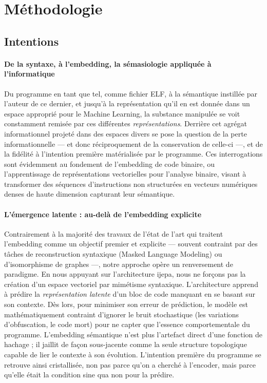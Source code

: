 \section{Méthodologie}\label{sec:methodologie}

\subsection{Intentions}\label{sub:intentions}

\paragraph{De la syntaxe, à l'embedding, la sémasiologie appliquée à l'informatique}

Du programme en tant que tel, comme fichier ELF, à la sémantique instillée par l'auteur de ce dernier, et jusqu'à la représentation qu'il en est donnée dans un espace approprié pour le Machine Learning, la substance manipulée se voit constamment remisée par ces différentes \textit{représentations}.
Derrière cet agrégat informationnel projeté dans des espaces divers se pose la question de la perte informationnelle --- et donc réciproquement de la conservation de celle-ci ---, et de la fidélité à l'intention première matérialisée par le programme.
Ces interrogations sont évidemment au fondement de l'embedding de code binaire, ou l'apprentissage de représentations vectorielles pour l'analyse binaire, visant à transformer des séquences d'instructions non structurées en vecteurs numériques denses de haute dimension capturant leur sémantique.


\paragraph{L'émergence latente : au-delà de l'embedding explicite}\label{par:emergence-latente} %

Contrairement à la majorité des travaux de l'état de l'art qui traitent l'embedding comme un objectif premier et explicite --- souvent contraint par des tâches de reconstruction syntaxique (Masked Language Modeling) ou d'isomorphisme de graphes ---, notre approche opère un renversement de paradigme.
En nous appuyant sur l'architecture \gls{ijepa}\cite{assran2023self}, nous ne forçons pas la création d'un espace vectoriel par mimétisme syntaxique. 
L'architecture apprend à prédire la \emph{représentation latente} d'un bloc de code manquant en se basant sur son contexte. 
Dès lors, pour minimiser son erreur de prédiction, le modèle est mathématiquement contraint d'ignorer le bruit stochastique (les variations d'obfuscation, le code mort) pour ne capter que l'essence comportementale du programme.
L'embedding sémantique n'est plus l'artefact direct d'une fonction de hachage ; il jaillit de façon sous-jacente comme la seule structure topologique capable de lier le contexte à son évolution. 
L'intention première du programme se retrouve ainsi cristallisée, non pas parce qu'on a cherché à l'encoder, mais parce qu'elle était la condition sine qua non pour la prédire.

